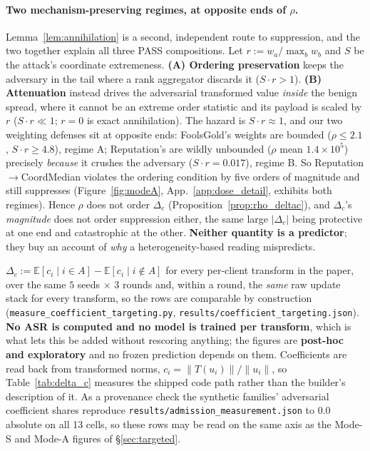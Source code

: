 \documentclass{article}
\begin{document}
\paragraph{Two mechanism-preserving regimes, at opposite ends of $\rho$.} Lemma~\ref{lem:annihilation} is a second, independent route to suppression, and the two together explain all three PASS compositions. Let $r := w_a/\max_b w_b$ and $S$ be the attack's coordinate extremeness. \textbf{(A) Ordering preservation} keeps the adversary in the tail where a rank aggregator discards it ($S \cdot r > 1$). \textbf{(B) Attenuation} instead drives the adversarial transformed value \emph{inside} the benign spread, where it cannot be an extreme order statistic and its payload is scaled by $r$ ($S \cdot r \ll 1$; $r=0$ is exact annihilation). The hazard is $S \cdot r \approx 1$, and our two weighting defenses sit at opposite ends: FoolsGold's weights are bounded ($\rho \le 2.1$, $S\cdot r \ge 4.8$), regime A; Reputation's are wildly unbounded ($\rho$ mean $1.4{\times}10^{5}$) precisely \emph{because} it crushes the adversary ($S\cdot r = 0.017$), regime B. So Reputation$\to$CoordMedian violates the ordering condition by five orders of magnitude and still suppresses (Figure~\ref{fig:modeA}, App.~\ref{app:dose_detail}, exhibits both regimes). Hence $\rho$ does not order $\Delta_c$ (Proposition~\ref{prop:rho_deltac}), and $\Delta_c$'s \emph{magnitude} does not order suppression either, the same large $|\Delta_c|$ being protective at one end and catastrophic at the other. \textbf{Neither quantity is a predictor}; they buy an account of \emph{why} a heterogeneity-based reading mispredicts.

$\Delta_c := \mathbb{E}[c_i \mid i \in A] - \mathbb{E}[c_i \mid i \notin A]$ for every per-client transform in the paper, over the same $5$ seeds $\times$ $3$ rounds and, within a round, the \emph{same} raw update stack for every transform, so the rows are comparable by construction (\texttt{measure\_coefficient\_targeting.py}, \texttt{results/coefficient\_targeting.json}). \textbf{No ASR is computed and no model is trained per transform}, which is what lets this be added without rescoring anything; the figures are \textbf{post-hoc and exploratory} and no frozen prediction depends on them. Coefficients are read back from transformed norms, $c_i = \|T(u_i)\|/\|u_i\|$, so Table~\ref{tab:delta_c} measures the shipped code path rather than the builder's description of it. As a provenance check the synthetic families' adversarial coefficient shares reproduce \texttt{results/admission\_measurement.json} to $0.0$ absolute on all 13 cells, so these rows may be read on the same axis as the Mode-S and Mode-A figures of \S\ref{sec:targeted}.
\end{document}

